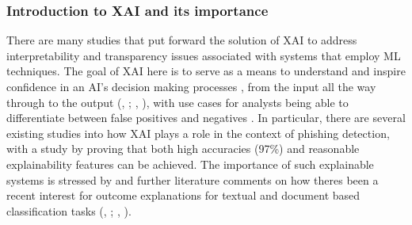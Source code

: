 
\subsubsection*{Introduction to XAI and its importance}
There are many studies that put forward the solution of XAI to address interpretability and transparency issues \citep{roshan2022using} associated with systems that employ ML techniques. The goal of XAI here is to serve as a means to understand and inspire confidence in an AI's decision making processes \citep{khanom2025pd_ebm}, from the input all the way through to the output (\citeauthor{jawale2020jeevn}, \citeyear{jawale2020jeevn}; \citeauthor{sanchez2022phishing}, \citeyear{sanchez2022phishing}), with use cases for analysts being able to differentiate between false positives and negatives \citep{van2024applicability}. In particular, there are several existing studies into how XAI plays a role in the context of phishing detection, with a study by \cite{alzahrani2024explainable} proving that both high accuracies (97\%) and reasonable explainability features can be achieved. The importance of such explainable systems is stressed by \cite{shendkar2024enhancing} and further literature comments on how theres been a recent interest for outcome explanations for textual and document based classification tasks (\citeauthor{martens2014explaining}, \citeyear{martens2014explaining}; \citeauthor{lei2016rationalizing}, \citeyear{lei2016rationalizing}).
